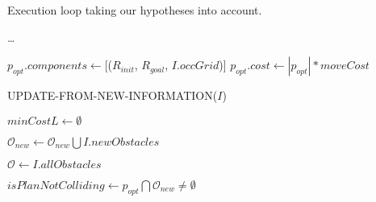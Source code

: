 \begin{algorithm}[H]

  \caption{Execution loop taking our hypotheses into account.}

  \label{alg:03-custom-basicmods-makeandexecuteplan}

  \begin{algorithmic}[1]

     \label{lst:line:partialline_1}

      \State \dots \label{lst:line:initbis1} 

      \State {} \label{lst:line:partialline_2}

      \State $p_{opt}.components \gets [$($R_{init}$, $R_{goal}$, $I.occGrid$)]
      \State $p_{opt}.cost \gets |p_{opt}| * moveCost$ \label{lst:line:initbis2}


        \State UPDATE-FROM-NEW-INFORMATION($I$) \label{lst:line:knowledge1}

          \State $minCostL \gets \emptyset$
        \EndIf

        \State $\mathcal{O}_{new} \gets \mathcal{O}_{new} \bigcup I.newObstacles$

        \State $\mathcal{O} \gets I.allObstacles$

        \State $isPlanNotColliding \gets p_{opt} \bigcap \mathcal{O}_{new} \neq \emptyset$

        \State {} \label{lst:line:validity1}
        \State {}
        \State {}
          \label{lst:line:checkvalidity_1}
          \State {} \label{lst:line:brackets_operator_1}
            \State {}  \label{lst:line:brackets_operator_2}
            \State {} \label{lst:line:get_safe_swept_are_call_1}
             \label{lst:line:pushpose_1}
              \State {}
            \EndIf \label{lst:line:pushpose_2}
          \EndIf
           \label{lst:line:area_intersect_1}
            \State {}
          \EndIf \label{lst:line:area_intersect_2}
        \EndIf \label{lst:line:knowledge2} \label{lst:line:validity2}


\end{algorithmic}
\end{algorithm}
